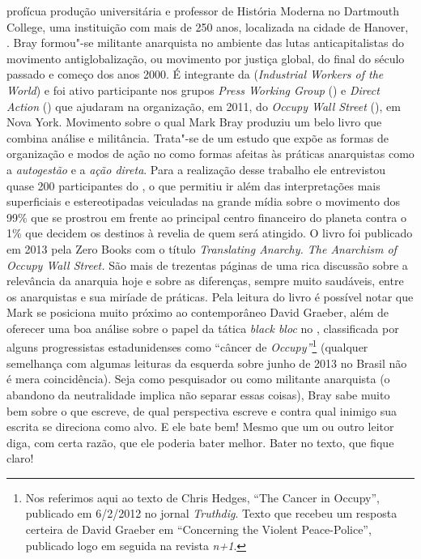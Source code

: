 \noindent{}profícua
produção universitária e professor de História Moderna no Dartmouth 
College, uma instituição com mais de 250 anos, localizada na cidade de
Hanover, . Bray formou"-se militante anarquista no ambiente das lutas
anticapitalistas do movimento antiglobalização, ou movimento por
justiça global, do final do século passado e começo dos anos 2000. É
integrante da  (\emph{Industrial Workers of the World}) e foi ativo
participante nos grupos \emph{Press Working Group} () e \emph{Direct Action} ()
que ajudaram na organização, em 2011, do \emph{Occupy Wall Street} (), em
Nova York. Movimento sobre o qual Mark Bray produziu um belo livro que
combina análise e militância. Trata"-se de um estudo que expõe as formas
de organização e modos de ação no  como formas afeitas às práticas
anarquistas como a \emph{autogestão} e a \emph{ação direta}. Para a
realização desse trabalho ele entrevistou quase 200 participantes do
, o que permitiu ir além das interpretações mais superficiais e
estereotipadas veiculadas na grande mídia sobre o movimento dos 99\% que
se prostrou em frente ao principal centro financeiro do planeta contra o
1\% que decidem os destinos à revelia de quem será atingido. O livro foi
publicado em 2013 pela Zero Books com o título \emph{Translating
Anarchy. The Anarchism of Occupy Wall Street.} São mais de trezentas
páginas de uma rica discussão sobre a relevância da anarquia hoje e
sobre as diferenças, sempre muito saudáveis, entre os anarquistas e sua
miríade de práticas. Pela leitura do livro é possível notar que Mark se
posiciona muito próximo ao contemporâneo David Graeber, além de oferecer
uma boa análise sobre o papel da tática \emph{black bloc} no ,
classificada por alguns progressistas estadunidenses como ``câncer de
\emph{Occupy''}\footnote{Nos referimos aqui ao texto de Chris Hedges,
  ``The Cancer in Occupy'', publicado em 6/2/2012 no jornal \emph{Truthdig}.
  Texto que recebeu um resposta certeira de David Graeber em
  ``Concerning the Violent Peace-Police'', publicado logo em seguida na
  revista \emph{n+1}.} (qualquer semelhança com
algumas leituras da esquerda sobre junho de 2013 no Brasil não é mera
coincidência). Seja como pesquisador ou como militante anarquista (o
abandono da neutralidade implica não separar essas coisas), Bray sabe
muito bem sobre o que escreve, de qual perspectiva escreve e contra qual
inimigo sua escrita se direciona como alvo. E ele bate bem! Mesmo que um
ou outro leitor diga, com certa razão, que ele poderia bater melhor.
Bater no texto, que fique claro!

